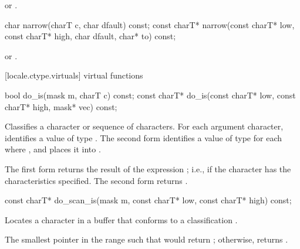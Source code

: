 \begin{itemdescr}
\pnum
\returns
{}
or
.
\end{itemdescr}

%
\begin{itemdecl}
char         narrow(charT c, char dfault) const;
const charT* narrow(const charT* low, const charT* high, char dfault, char* to) const;
\end{itemdecl}

\begin{itemdescr}
\pnum
\returns
{}
or
.
\end{itemdescr}

[locale.ctype.virtuals]{ virtual functions}

%
\begin{itemdecl}
bool         do_is(mask m, charT c) const;
const charT* do_is(const charT* low, const charT* high, mask* vec) const;
\end{itemdecl}

\begin{itemdescr}
\pnum
\effects
Classifies a character or sequence of characters.
For each argument character, identifies a value
of type
.
The second form identifies a value  of type
for each
where
,
and places it into
.

\pnum
\returns
The first form returns the result of the expression
;
i.e.,
if the character has the characteristics specified.
The second form returns .
\end{itemdescr}

%
\begin{itemdecl}
const charT* do_scan_is(mask m, const charT* low, const charT* high) const;
\end{itemdecl}

\begin{itemdescr}
\pnum
\effects
Locates a character in a buffer that conforms to a classification
.

\pnum
\returns
The smallest pointer  in the range
such that
would return
;
otherwise, returns .
\end{itemdescr}

